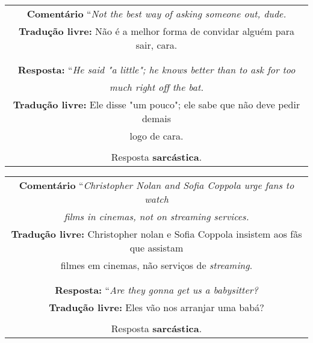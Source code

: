 \begin{center}
\begin{tabular}{|c|}

\hline

\textbf{Comentário} ``\textit{Not the best way of asking someone out, dude.} \\

\textbf{Tradução livre:} Não é a melhor forma de convidar alguém para sair,
cara. \\ \\

\hline

\\

\textbf{Resposta:} ``\textit{He said "a little"; he knows better than to ask for
too} \\
\textit{much right off the bat.} \\

\textbf{Tradução livre:} Ele disse "um pouco"; ele sabe que não deve pedir demais \\
logo de cara. \\ \\

Resposta \textbf{sarcástica}.

\\ \hline

\end{tabular}
\end{center}

\begin{center}
\begin{tabular}{|c|}

\hline

\textbf{Comentário} ``\textit{Christopher Nolan and Sofia Coppola urge fans to
watch} \\
\textit{films in cinemas, not on streaming services.} \\

\textbf{Tradução livre:} Christopher nolan e Sofia Coppola insistem aos fãs que
assistam \\
filmes em cinemas, não serviços de \textit{streaming}. \\ \\

\hline

\\

\textbf{Resposta:} ``\textit{Are they gonna get us a babysitter?} \\

\textbf{Tradução livre:} Eles vão nos arranjar uma babá? \\ \\

Resposta \textbf{sarcástica}.

\\ \hline

\end{tabular}
\end{center}

